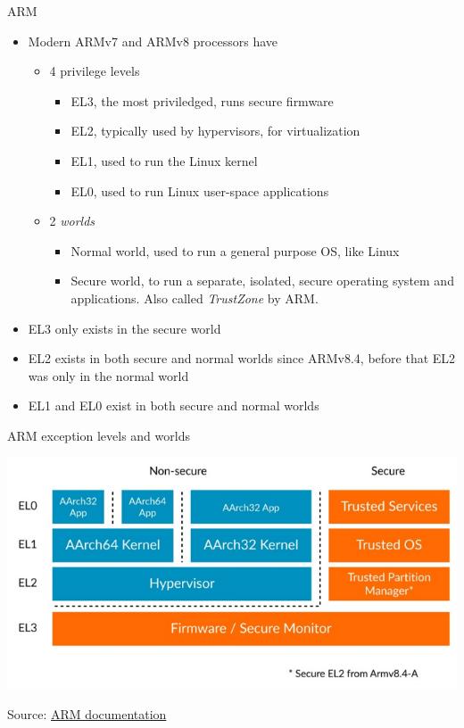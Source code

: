 \begin{frame}{ARM}
  \begin{itemize}
  \item Modern ARMv7 and ARMv8 processors have
    \begin{itemize}
    \item 4 privilege levels
      \begin{itemize}
      \item EL3, the most priviledged, runs secure firmware
      \item EL2, typically used by hypervisors, for virtualization
      \item EL1, used to run the Linux kernel
      \item EL0, used to run Linux user-space applications
      \end{itemize}
    \item 2 {\em worlds}
      \begin{itemize}
      \item Normal world, used to run a general purpose OS, like Linux
      \item Secure world, to run a separate, isolated, secure
        operating system and applications. Also called {\em TrustZone}
        by ARM.
      \end{itemize}
    \end{itemize}
  \item EL3 only exists in the secure world
  \item EL2 exists in both secure and normal worlds since ARMv8.4,
    before that EL2 was only in the normal world
  \item EL1 and EL0 exist in both secure and normal worlds
  \end{itemize}
\end{frame}

\begin{frame}{ARM exception levels and worlds}
  \begin{center}
    \includegraphics[height=0.75\textheight]{slides/sysdev-bootloaders-sequence/arm-exception-levels.png}
  \end{center}
  Source: \href{https://developer.arm.com/documentation/102412/0102/Execution-and-Security-states}{ARM documentation}
\end{frame}

